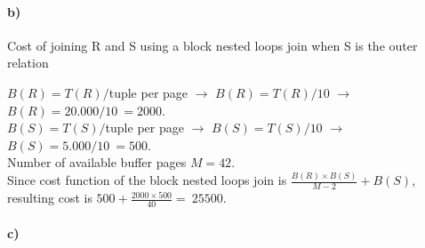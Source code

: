 \documentclass[a4paper,12pt]{article}
\begin{document}
\paragraph{b)}  
Cost of joining R and S using a block nested loops join when S is the outer relation
\begin{tcolorbox}
$B(R) = T(R)/$tuple per page $\rightarrow$ $B(R) = T(R)/10$ $\rightarrow$ $B(R) = 20.000/10\ = 2000$. \\
$B(S) = T(S)/$tuple per page $\rightarrow$ $B(S) = T(S)/10$ $\rightarrow$ $B(S) = 5.000/10\ = 500$.\\
Number of available buffer pages $M = 42$.\\
Since cost function of the block nested loops join is $\frac{B(R)\times B(S)}{M-2} + B(S)$,\\ resulting cost is $500+\frac{2000\times 500}{40} =\ 25500$.
\end{tcolorbox}

\paragraph{c)} 
\end{document}
